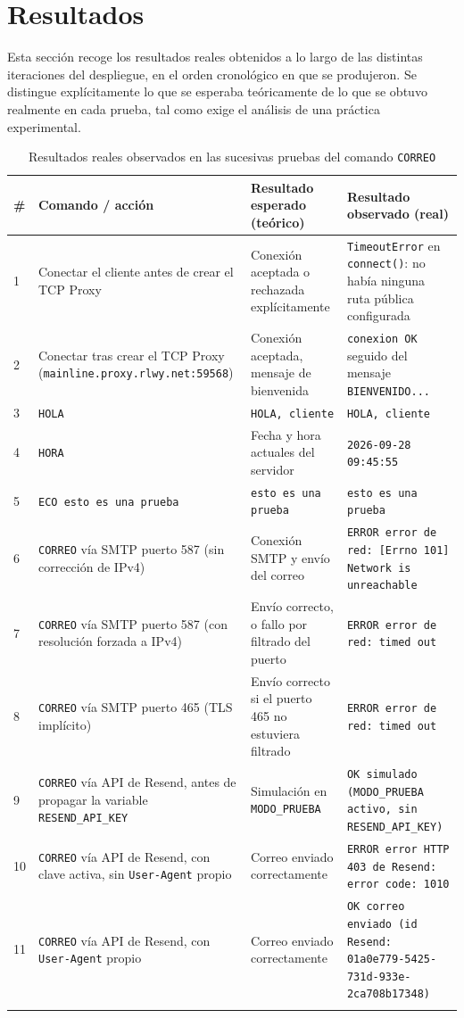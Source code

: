 \documentclass[12pt,a4paper]{article}
\begin{document}
\section{Resultados}

Esta sección recoge los resultados reales obtenidos a lo largo de las distintas iteraciones del despliegue, en el orden cronológico en que se produjeron. Se distingue explícitamente lo que se esperaba teóricamente de lo que se obtuvo realmente en cada prueba, tal como exige el análisis de una práctica experimental.

\begin{longtable}{@{}p{0.5cm}p{4cm}p{4.3cm}p{5.2cm}@{}}
\toprule
\textbf{\#} & \textbf{Comando / acción} & \textbf{Resultado esperado (teórico)} & \textbf{Resultado observado (real)} \\
\midrule
\endhead
1 & Conectar el cliente antes de crear el TCP Proxy & Conexión aceptada o rechazada explícitamente & \texttt{TimeoutError} en \texttt{connect()}: no había ninguna ruta pública configurada \\
2 & Conectar tras crear el TCP Proxy (\texttt{mainline.proxy.rlwy.net:59568}) & Conexión aceptada, mensaje de bienvenida & \texttt{conexion OK} seguido del mensaje \texttt{BIENVENIDO...} \\
3 & \texttt{HOLA} & \texttt{HOLA, cliente} & \texttt{HOLA, cliente} \\
4 & \texttt{HORA} & Fecha y hora actuales del servidor & \texttt{2026-09-28 09:45:55} \\
5 & \texttt{ECO esto es una prueba} & \texttt{esto es una prueba} & \texttt{esto es una prueba} \\
6 & \texttt{CORREO} vía SMTP puerto 587 (sin corrección de IPv4) & Conexión SMTP y envío del correo & \texttt{ERROR error de red: [Errno 101] Network is unreachable} \\
7 & \texttt{CORREO} vía SMTP puerto 587 (con resolución forzada a IPv4) & Envío correcto, o fallo por filtrado del puerto & \texttt{ERROR error de red: timed out} \\
8 & \texttt{CORREO} vía SMTP puerto 465 (TLS implícito) & Envío correcto si el puerto 465 no estuviera filtrado & \texttt{ERROR error de red: timed out} \\
9 & \texttt{CORREO} vía API de Resend, antes de propagar la variable \texttt{RESEND\_API\_KEY} & Simulación en \texttt{MODO\_PRUEBA} & \texttt{OK simulado (MODO\_PRUEBA activo, sin RESEND\_API\_KEY)} \\
10 & \texttt{CORREO} vía API de Resend, con clave activa, sin \texttt{User-Agent} propio & Correo enviado correctamente & \texttt{ERROR error HTTP 403 de Resend: error code: 1010} \\
11 & \texttt{CORREO} vía API de Resend, con \texttt{User-Agent} propio & Correo enviado correctamente & \texttt{OK correo enviado (id Resend: 01a0e779-5425-731d-933e-2ca708b17348)} \\
\bottomrule
\caption{Resultados reales observados en las sucesivas pruebas del comando \texttt{CORREO}}
\label{tab:resultados}
\end{longtable}
\end{document}
